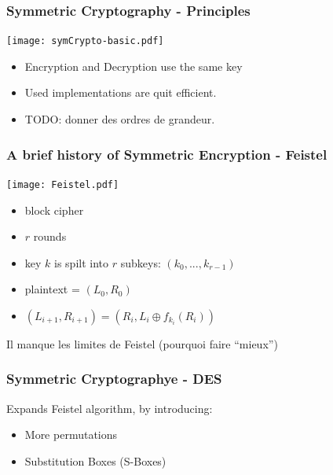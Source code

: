 \documentclass[
hyperref={pdfpagelabels=false}
,xcolor=table
]
{beamer}
\begin{document}
\begin{frame}
  \frametitle{Symmetric Cryptography - Principles}

  \begin{center}
    \texttt{[image: symCrypto-basic.pdf]}
  \end{center}

  \begin{itemize}
  \item Encryption and Decryption use the same key
  \item Used implementations are quit efficient. 
  \item TODO: donner des ordres de grandeur. 
  \end{itemize}
\end{frame}


\begin{frame}
  \frametitle{A brief history of Symmetric Encryption - Feistel}
  \begin{minipage}{.35\linewidth}
    \texttt{[image: Feistel.pdf]}
  \end{minipage}
  \begin{minipage}{.55\linewidth}
    \begin{itemize}
    \item block cipher
    \item $r$ rounds
    \item key $k$ is spilt into $r$ subkeys: $(k_0, ..., k_{r-1})$
    \item plaintext = $(L_0, R_0)$
    \item $(L_{i+1}, R_{i+1}) = (R_i, L_i \oplus f_{k_i}(R_i))$
    \end{itemize}
  \end{minipage}


  \alert{Il manque les limites de Feistel (pourquoi faire ``mieux'')}
  
\end{frame}


\begin{frame}
  \frametitle{Symmetric Cryptographye - DES}

  Expands Feistel algorithm, by introducing: 
  \begin{itemize}
  \item More permutations
  \item Substitution Boxes (S-Boxes)
  \end{itemize}

\end{frame}
\end{document}
